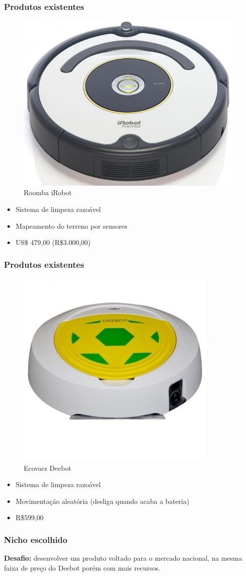 \documentclass{beamer}
\begin{document}
\begin{frame}
  \frametitle{Produtos existentes}
  \begin{figure}[ht]
  \includegraphics[width=.4\textwidth]{images/irobot.jpg}
  \caption{Roomba iRobot}
  \end{figure}
  \begin{itemize}
  	\item Sistema de limpeza razoável
  	\item Mapeamento do terreno por sensores
  	\item US\$ 479,00 (R\$3.000,00)
  \end{itemize}
\end{frame}

\begin{frame}
  \frametitle{Produtos existentes}
  \begin{figure}[ht]
    \includegraphics[width=.30\textwidth]{images/deebot.jpg}
    \caption{Ecovacs Deebot}
  \end{figure}
  \begin{itemize}
  	\item Sistema de limpeza razoável
  	\item Movimentação aleatória (desliga quando acaba a bateria)
  	\item R\$599,00
  \end{itemize}
\end{frame}

\begin{frame}
  \frametitle{Nicho escolhido}
  \textbf{Desafio:} desenvolver um produto voltado para o mercado nacional, na mesma faixa de preço do Deebot porém com mais recursos.
\end{frame}
\end{document}
